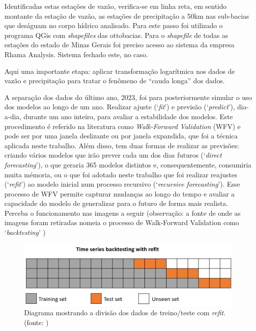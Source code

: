 Identificadas estas estações de vazão, verifica-se em linha reta, em sentido montante da estação de vazão, as estações de precipitação a 50km nas sub-bacias que deságuam no corpo hídrico analisado. Para este passo foi utilizado o programa QGis com \textit{shapefiles} das ottobacias.\cite{snirh_ottobacia_2024} Para o \textit{shapefile} de todas as estações do estado de Minas Gerais foi preciso acesso ao sistema da empresa Rhama Analysis. Sistema fechado este, no caso.


Aqui uma importante etapa: aplicar transformação logarítmica nos dados de vazão e precipitação para tratar o fenômeno de ``cauda longa'' dos dados.

A separação dos dados do último ano, 2023, foi para posteriormente simular o uso dos modelos ao longo de um ano. Realizar ajuste (`\textit{fit}') e previsão (`\textit{predict}'), dia-a-dia, durante um ano inteiro, para avaliar a estabilidade dos modelos. Este procedimento é referido na literatura como \textit{Walk-Forward Validation} (WFV) e pode ser por uma janela deslizante ou por janela expandida, que foi a técnica aplicada neste trabalho. Além disso, tem duas formas de realizar as previsões: criando vários modelos que irão prever cada um dos dias futuros (`\textit{direct forecasting}'), o que geraria 365 modelos distintos e, consequentemente, consumiria muita mémoria, ou o que foi adotado neste trabalho que foi realizar reajustes (`\textit{refit}') ao modelo inicial num processo recursivo (`\textit{recursive forecasting}'). Esse processo de WFV permite capturar mudanças ao longo do tempo e avaliar a capacidade do modelo de generalizar para o futuro de forma mais realista. Perceba o funcionamento nas imagens a seguir (observação: a fonte de onde as imagens foram retiradas nomeia o processo de Walk-Forward Validation como `\textit{backtesting}' \cite{skforecast})

\begin{figure}[!h]
	\centering
	\includegraphics[scale=0.3]{Figuras/skforecast-diagram-backtesting-refit.png}
	\caption{Diagrama mostrando a divisão dos dados de treino/teste com \textit{refit}.\\(fonte: \cite{skforecast})}
	\label{fig:skforecast-diagram-backtesting-refit}
\end{figure}

